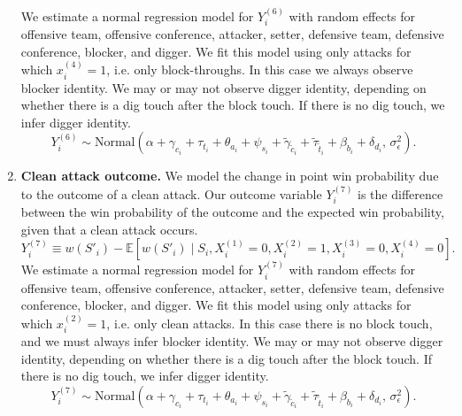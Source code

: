 \documentclass{article}
\begin{document}
\begin{enumerate}
\begin{equation*}
        \end{equation*}
        We estimate a normal regression model for $Y_i^{(6)}$ with random effects for offensive team, offensive conference, attacker, setter, defensive team, defensive conference, blocker, and digger. We fit this model using only attacks for which $x_i^{(4)} = 1$, i.e. only block-throughs. In this case we always observe blocker identity. We may or may not observe digger identity, depending on whether there is a dig touch after the block touch. If there is no dig touch, we infer digger identity.
        \begin{equation}
        \label{eqn:attack-model-6}
            Y_i^{(6)} \sim \mbox{Normal}\left(
                \alpha + \gamma_{c_i} + \tau_{t_i} + \theta_{a_i} + \psi_{s_i} + \tilde\gamma_{\tilde c_i} + \tilde\tau_{\tilde t_i} + \beta_{b_i} + \delta_{d_i},\,
                \sigma^2_\epsilon
            \right).
        \end{equation}
    \item
        {\bf Clean attack outcome.} We model the change in point win probability due to the outcome of a clean attack. Our outcome variable $Y_i^{(7)}$ is the difference between the win probability of the outcome and the expected win probability, given that a clean attack occurs.
        \begin{equation*}
            Y_i^{(7)} \equiv w(S'_i) - \mathbb{E}\left[w(S'_i) \mid S_i, X_i^{(1)} = 0, X_i^{(2)} = 1, X_i^{(3)} = 0, X_i^{(4)} = 0\right].
        \end{equation*}
        We estimate a normal regression model for $Y_i^{(7)}$ with random effects for offensive team, offensive conference, attacker, setter, defensive team, defensive conference, blocker, and digger. We fit this model using only attacks for which $x_i^{(2)} = 1$, i.e. only clean attacks. In this case there is no block touch, and we must always infer blocker identity. We may or may not observe digger identity, depending on whether there is a dig touch after the block touch. If there is no dig touch, we infer digger identity.
        \begin{equation}
        \label{eqn:attack-model-7}
            Y_i^{(7)} \sim \mbox{Normal}\left(
                \alpha + \gamma_{c_i} + \tau_{t_i} + \theta_{a_i} + \psi_{s_i} + \tilde\gamma_{\tilde c_i} + \tilde\tau_{\tilde t_i} + \beta_{b_i} + \delta_{d_i},\,
                \sigma^2_\epsilon
            \right).
        \end{equation}
\end{enumerate}
\end{document}
